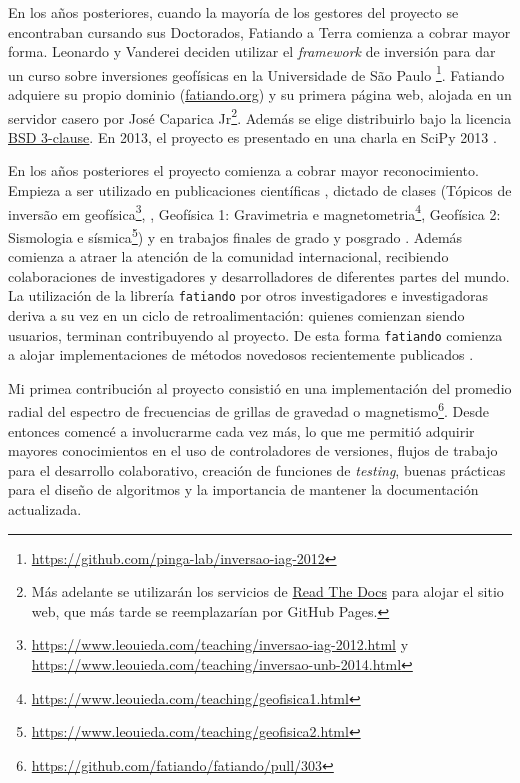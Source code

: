 En los años posteriores, cuando la mayoría de los gestores del proyecto se
encontraban cursando sus Doctorados, Fatiando a Terra comienza a cobrar mayor
forma.
Leonardo y Vanderei deciden utilizar el \emph{framework} de inversión para dar
un curso sobre inversiones geofísicas en la Universidade de São Paulo%
\footnote{\url{https://github.com/pinga-lab/inversao-iag-2012}}.
Fatiando adquiere su propio dominio
(\href{https://www.fatiando.org}{fatiando.org}) y su primera página web,
alojada en un servidor casero por José Caparica Jr\footnote{%
    Más adelante se utilizarán los servicios de
    \href{https://readthedocs.org/}{Read The Docs} para alojar el sitio web,
    que más tarde se reemplazarían por GitHub Pages.
}.
Además se elige distribuirlo bajo la licencia
\href{https://opensource.org/licenses/BSD-3-Clause}{BSD 3-clause}.
En 2013, el proyecto es presentado en una charla en SciPy 2013
\citep{uieda2013}.

En los años posteriores el proyecto comienza a cobrar mayor reconocimiento.
Empieza a ser utilizado en publicaciones científicas
\citep[][entre otros]{%
    uieda2012,
    carlos2014,
    oliveira2015,
    hidalgogato2015,
    carlos2016,
    reis2016,
    uieda2017,
    hidalgogato2017,
    siqueira2017%
},
dictado de clases
(Tópicos de inversão em
geofísica\footnote{%
    \url{https://www.leouieda.com/teaching/inversao-iag-2012.html}
    y \url{https://www.leouieda.com/teaching/inversao-unb-2014.html}
},
\citet{uieda2014},
Geofísica 1: Gravimetria e magnetometria\footnote{%
    \url{https://www.leouieda.com/teaching/geofisica1.html}
},
Geofísica 2: Sismologia e sísmica\footnote{%
    \url{https://www.leouieda.com/teaching/geofisica2.html}
})
y en trabajos finales de grado y posgrado
\citep{carlos2013, sales2014, soler2015, uieda2016b, melo2020}.
Además comienza a atraer la atención de la comunidad internacional, recibiendo
colaboraciones de investigadores y desarrolladores de diferentes partes del
mundo.
La utilización de la librería \texttt{fatiando} por otros investigadores
e investigadoras deriva a su vez en un ciclo de retroalimentación: quienes
comienzan siendo usuarios, terminan contribuyendo al proyecto.
De esta forma \texttt{fatiando} comienza a alojar implementaciones de métodos
novedosos recientemente publicados \citep{uieda2012b, oliveira2013}.

Mi primea contribución al proyecto consistió en una implementación del promedio
radial del espectro de frecuencias de grillas de gravedad
o magnetismo\footnote{%
    \url{https://github.com/fatiando/fatiando/pull/303}
}.
Desde entonces comencé a involucrarme cada vez más, lo que me permitió adquirir
mayores conocimientos en el uso de controladores de versiones, flujos de
trabajo para el desarrollo colaborativo, creación de funciones de
\emph{testing}, buenas prácticas para el diseño de algoritmos y la importancia
de mantener la documentación actualizada.

